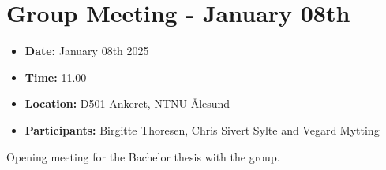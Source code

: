 \section*{Group Meeting - January 08th}
\begin{itemize}
    \item \textbf{Date:} January 08th 2025
    \item \textbf{Time:} 11.00 -
    \item \textbf{Location:} D501 Ankeret, NTNU Ålesund
    \item \textbf{Participants:} Birgitte Thoresen, Chris Sivert Sylte and Vegard Mytting
\end{itemize}

Opening meeting for the Bachelor thesis with the group. 